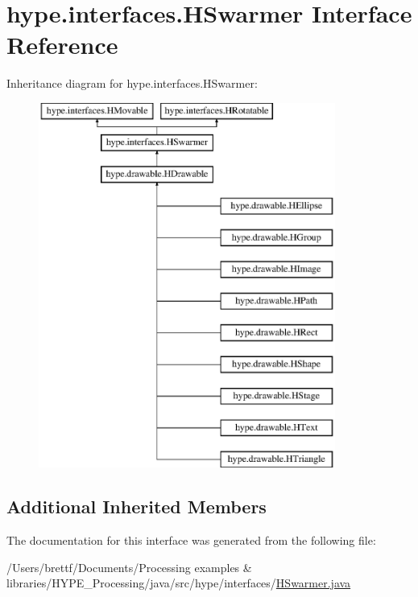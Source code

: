 \hypertarget{interfacehype_1_1interfaces_1_1_h_swarmer}{\section{hype.\-interfaces.\-H\-Swarmer Interface Reference}
\label{interfacehype_1_1interfaces_1_1_h_swarmer}
}
Inheritance diagram for hype.\-interfaces.\-H\-Swarmer\-:\begin{figure}[H]
\begin{center}
\leavevmode
\includegraphics[height=12.000000cm]{interfacehype_1_1interfaces_1_1_h_swarmer}
\end{center}
\end{figure}
\subsection*{Additional Inherited Members}


The documentation for this interface was generated from the following file\-:\begin{DoxyCompactItemize}
\item 
/\-Users/brettf/\-Documents/\-Processing examples \& libraries/\-H\-Y\-P\-E\-\_\-\-Processing/java/src/hype/interfaces/\hyperlink{_h_swarmer_8java}{H\-Swarmer.\-java}\end{DoxyCompactItemize}
